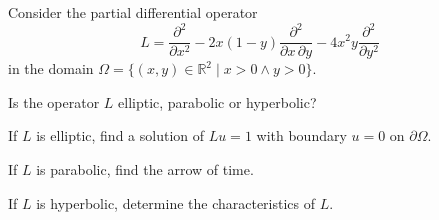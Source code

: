 Consider the partial differential operator
\begin{equation}
L
=
\frac{\partial^2}{\partial x^2}
-2x(1-y)\frac{\partial^2}{\partial x\,\partial y}
-4x^2y\frac{\partial^2}{\partial y^2}
\label{90000021:operator}
\end{equation}
in the domain $\Omega=\{(x,y)\in\mathbb R^2\;|\; x>0\wedge y>0\}$.
\begin{teilaufgaben}
\item
Is the operator $L$ elliptic, parabolic or hyperbolic?
\item
If $L$ is elliptic, find a solution of $Lu=1$ with boundary $u=0$
on $\partial\Omega$.
\item
If $L$ is parabolic, find the arrow of time.
\item
If $L$ is hyperbolic, determine the characteristics of $L$.
\end{teilaufgaben}


